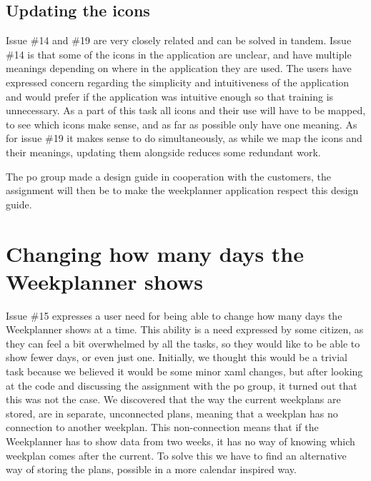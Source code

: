 \subsection{Updating the icons}
Issue \#14 and \#19 are very closely related and can be solved in tandem. Issue \#14 is that some of the icons in the application are unclear, and have multiple meanings depending on where in the application they are used. The users have expressed concern regarding the simplicity and intuitiveness of the application and would prefer if the application was intuitive enough so that training is unnecessary.
As a part of this task all icons and their use will have to be mapped, to see which icons make sense, and as far as possible only have one meaning. As for issue \#19 it makes sense to do simultaneously, as while we map the icons and their meanings, updating them alongside reduces some redundant work. 

The \gls{po} group made a design guide in cooperation with the customers, the assignment will then be to make the weekplanner application respect this design guide.

\section{Changing how many days the Weekplanner shows}\label{sec:weekPlannerDaysToShow}

Issue \#15 expresses a user need for being able to change how many days the Weekplanner shows at a time. This ability is a need expressed by some citizen, as they can feel a bit overwhelmed by all the tasks, so they would like to be able to show fewer days, or even just one.
Initially, we thought this would be a trivial task because we believed it would be some minor \gls{xaml} changes, but after looking at the code and discussing the assignment with the \gls{po} group, it turned out that this was not the case. We discovered that the way the current weekplans are stored, are in separate, unconnected plans, meaning that a weekplan has no connection to another weekplan. This non-connection means that if the Weekplanner has to show data from two weeks, it has no way of knowing which weekplan comes after the current.
To solve this we have to find an alternative way of storing the plans, possible in a more calendar inspired way.

